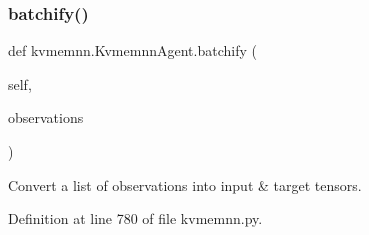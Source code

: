 \subsubsection{\texorpdfstring{batchify()}{batchify()}}
{\footnotesize\ttfamily def kvmemnn.\+Kvmemnn\+Agent.\+batchify (\begin{DoxyParamCaption}\item[{}]{self,  }\item[{}]{observations }\end{DoxyParamCaption})}

\begin{DoxyVerb}Convert a list of observations into input & target tensors.\end{DoxyVerb}
 

Definition at line 780 of file kvmemnn.\+py.



